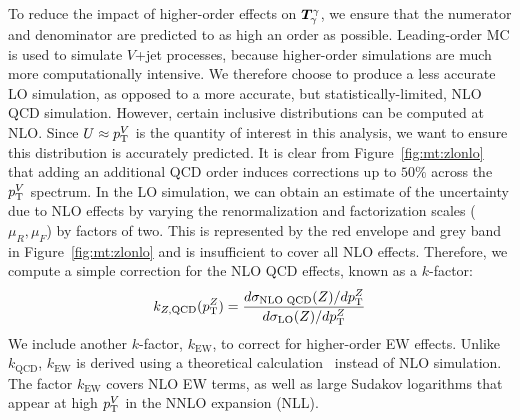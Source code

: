 To reduce the impact of higher-order effects on $\bm{T}^{\gamma}_{\gamma}$, we ensure that the numerator and denominator are predicted to as high an order as possible.
Leading-order MC is used to simulate $V$+jet processes, because higher-order simulations are much more computationally intensive.
We therefore choose to produce a less accurate LO simulation, as opposed to a more accurate, but statistically-limited, NLO QCD simulation.
However, certain inclusive distributions can be computed at NLO.
Since $U\approx p_\mathrm{T}^V$ is the quantity of interest in this analysis, we want to ensure this distribution is accurately predicted.
It is clear from Figure~\ref{fig:mt:zlonlo} that adding an additional QCD order induces corrections up to $50\%$ across the $p_\mathrm{T}^V$ spectrum.
In the LO simulation, we can obtain an estimate of the uncertainty due to NLO effects by varying the renormalization and factorization scales ($\mu_R,\mu_F$) by factors of two.
This is represented by the red envelope and grey band in Figure~\ref{fig:mt:zlonlo} and is insufficient to cover all NLO effects.
Therefore, we compute a simple correction for the NLO QCD effects, known as a $k$-factor:
\begin{equation}
    k_{Z,\mathrm{QCD}}(p_\mathrm{T}^Z) = \frac{d\sigma_\text{NLO QCD}(Z) / dp_\mathrm{T}^Z}{d\sigma_\mathrm{LO}(Z) / dp_\mathrm{T}^Z}
\end{equation}
We include another $k$-factor, $k_\mathrm{EW}$, to correct for higher-order EW effects.
Unlike $k_\mathrm{QCD}$, $k_\mathrm{EW}$ is derived using a theoretical calculation~\cite{ewk2,ewk3,ewk1} instead of NLO simulation.
The factor $k_\mathrm{EW}$ covers NLO EW terms, as well as large Sudakov logarithms that appear at high $p_\mathrm{T}^V$ in the NNLO expansion (NLL).


